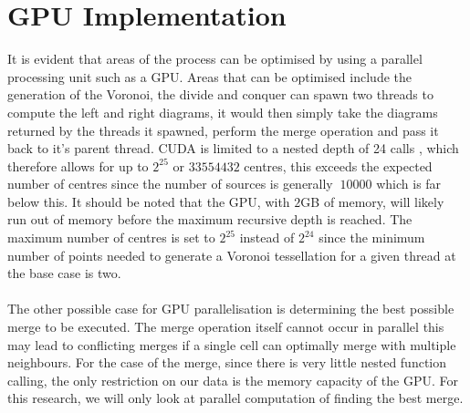 \section{GPU Implementation}
It is evident that areas of the process can be optimised by using a parallel processing unit such as a GPU. Areas that can be optimised include the generation of the Voronoi, the divide and conquer can spawn two threads to compute the left and right diagrams, it would then simply take the diagrams returned by the threads it spawned, perform the merge operation and pass it back to it's parent thread. CUDA is limited to a nested depth of 24 calls \citep{CUDA}, which therefore allows for up to $2^{25}$ or $33554432$ centres, this exceeds the expected number of centres since the number of sources is generally $~10000$ which is far below this. It should be noted that the GPU, with $2$GB of memory, will likely run out of memory before the maximum recursive depth is reached. The maximum number of centres is set to $2^{25}$ instead of $2^{24}$ since the minimum number of points needed to generate a Voronoi tessellation for a given thread at the base case is two.
\\
\\
The other possible case for GPU parallelisation is determining the best possible merge to be executed. The merge operation itself cannot occur in parallel this may lead to conflicting merges if a single cell can optimally merge with multiple neighbours. For the case of the merge, since there is very little nested function calling, the only restriction on our data is the memory capacity of the GPU. For this research, we will only look at parallel computation of finding the best merge.